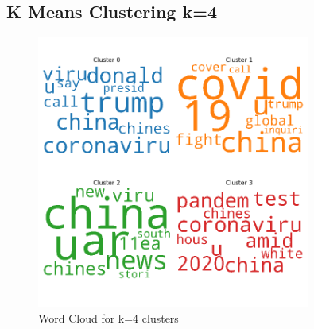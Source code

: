 \begin{appendices}
	\section{K Means Clustering k=4}
	\label{k4}
	\begin{figure}[H]
		\centering
		\includegraphics[width=0.8\textwidth]{images/kmeans_word_cloud_k=4.png}
		\caption{Word Cloud for k=4 clusters}
		\label{fig:wck4}
	\end{figure}
	

\end{appendices}
